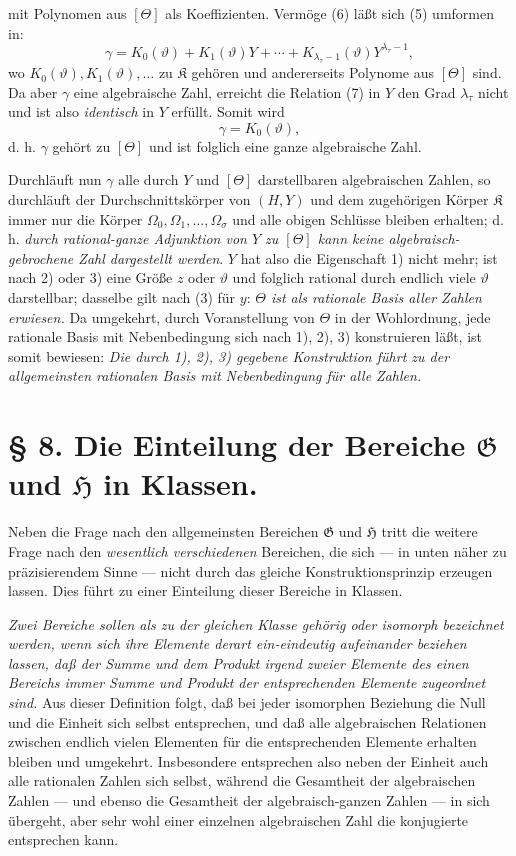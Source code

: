 \documentclass[11pt]{article}
\begin{document}
mit Polynomen aus $[\Theta]$ als Koeffizienten. Vermöge (6) läßt sich (5)
umformen in:
\begin{equation}
\gamma=K_0(\vartheta)+K_1(\vartheta)Y+\cdots+
K_{\lambda_\tau-1}(\vartheta)Y^{\lambda_\tau-1},
\tag{7}
\end{equation}
wo $K_0(\vartheta),K_1(\vartheta),\ldots$ zu $\mathfrak K$ gehören und
andererseits Polynome aus $[\Theta]$ sind. Da aber $\gamma$ eine algebraische
Zahl, erreicht die Relation (7) in $Y$ den Grad $\lambda_\tau$ nicht und ist
also \emph{identisch} in $Y$ erfüllt. Somit wird
\[
 \gamma=K_0(\vartheta),
\]
d. h. $\gamma$ gehört zu $[\Theta]$ und ist folglich eine ganze algebraische
Zahl.

Durchläuft nun $\gamma$ alle durch $Y$ und $[\Theta]$ darstellbaren
algebraischen Zahlen, so durchläuft der Durchschnittskörper von $(H,Y)$ und dem
zugehörigen Körper $\mathfrak K$ immer nur die Körper
$\Omega_0,\Omega_1,\ldots,\Omega_\sigma$ und alle obigen Schlüsse bleiben
erhalten; d. h. \emph{durch rational-ganze Adjunktion von $Y$ zu $[\Theta]$ kann
keine algebraisch-gebrochene Zahl dargestellt werden}. $Y$ hat also die
Eigenschaft 1) nicht mehr; ist nach 2) oder 3) eine Größe $z$ oder $\vartheta$
und folglich rational durch endlich viele $\vartheta$ darstellbar; dasselbe gilt
nach (3) für $y$: \emph{$\Theta$ ist als rationale Basis aller Zahlen erwiesen.}
Da umgekehrt, durch Voranstellung von $\Theta$ in der Wohlordnung, jede
rationale Basis mit Nebenbedingung sich nach 1), 2), 3) konstruieren läßt, ist
somit bewiesen: \emph{Die durch 1), 2), 3) gegebene Konstruktion führt zu der
allgemeinsten rationalen Basis mit Nebenbedingung für alle Zahlen.}

\section*{§ 8. Die Einteilung der Bereiche $\mathfrak G$ und $\mathfrak H$ in Klassen.}

Neben die Frage nach den allgemeinsten Bereichen $\mathfrak G$ und $\mathfrak H$
tritt die weitere Frage nach den \emph{wesentlich verschiedenen} Bereichen, die
sich --- in unten näher zu präzisierendem Sinne --- nicht durch das gleiche
Konstruktionsprinzip erzeugen lassen. Dies führt zu einer Einteilung dieser
Bereiche in Klassen.

\emph{Zwei Bereiche sollen als zu der gleichen Klasse gehörig oder isomorph
bezeichnet werden, wenn sich ihre Elemente derart ein-eindeutig aufeinander
beziehen lassen, daß der Summe und dem Produkt irgend zweier Elemente des einen
Bereichs immer Summe und Produkt der entsprechenden Elemente zugeordnet sind.}
Aus dieser Definition folgt, daß bei jeder isomorphen Beziehung die Null und die
Einheit sich selbst entsprechen, und daß alle algebraischen Relationen zwischen
endlich vielen Elementen für die entsprechenden Elemente erhalten bleiben und
umgekehrt. Insbesondere entsprechen also neben der Einheit auch alle rationalen
Zahlen sich selbst, während die Gesamtheit der algebraischen Zahlen --- und
ebenso die Gesamtheit der algebraisch-ganzen Zahlen --- in sich übergeht, aber
sehr wohl einer einzelnen algebraischen Zahl die konjugierte entsprechen kann.
\end{document}
